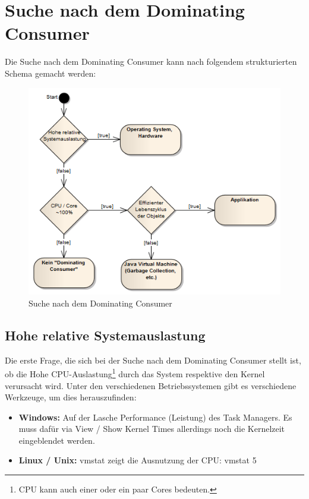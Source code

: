 \section{Suche nach dem Dominating Consumer}
Die Suche nach dem Dominating Consumer kann nach folgendem strukturierten Schema gemacht werden:
\begin{figure}[H]
  	\centering
    	\includegraphics[width=13.1cm]{images/dominating_consumer}
        	\caption{Suche nach dem Dominating Consumer}
\end{figure}

\subsection{Hohe relative Systemauslastung}\label{hohe_systemauslastung}
Die erste Frage, die sich bei der Suche nach dem Dominating Consumer stellt ist, ob die Hohe CPU-Auslastung\footnote{CPU kann auch einer oder ein paar Cores bedeuten.} durch das System respektive den Kernel verursacht wird. Unter den verschiedenen Betriebssystemen gibt es verschiedene Werkzeuge, um dies herauszufinden:
\begin{itemize}
	\item \textbf{Windows:} Auf der Lasche Performance (Leistung) des Task Managers. Es muss dafür via View / Show Kernel Times allerdings noch die Kernelzeit eingeblendet werden.
	\item \textbf{Linux / Unix: } vmstat zeigt die Ausnutzung der CPU: vmstat 5
\end{itemize}

